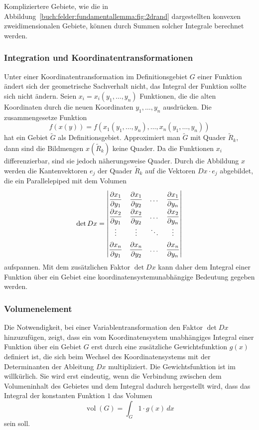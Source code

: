 Kompliziertere Gebiete, wie die in
Abbildung~\ref{buch:felder:fundamentallemma:fig:2drand}
dargestellten konvexen zweidimensionalen Gebiete, können durch Summen solcher
Integrale berechnet werden.

%
%
\subsubsection{Integration und Koordinatentransformationen}
Unter einer Koordinatentransformation im Definitionsgebiet 
$G$ einer Funktion ändert sich der geometrische Sachverhalt nicht,
das Integral der Funktion sollte sich nicht ändern.
Seien $x_i=x_i(y_1,\dots,y_n)$ Funktionen, die die alten Koordinaten
durch die neuen Koordinaten $y_1,\dots,y_n$ ausdrücken.
Die zusammengesetze Funktion
\[
f(x(y))
=
f(x_1(y_1,\dots,y_n),\dots,x_n(y_1,\dots,y_n))
\]
hat ein Gebiet $\tilde{G}$ als Definitionsgebiet.
Approximiert man $\tilde{G}$ mit Quader $\tilde{R}_k$, dann sind
die Bildmengen $x(\tilde{R}_k)$ keine Quader.
Da die Funktionen $x_i$ differenzierbar, sind sie jedoch näherungsweise
Quader.
Durch die Abbildung $x$ werden die Kantenvektoren $e_j$ der Quader 
$\tilde{R}_k$ auf die Vektoren $Dx\cdot e_j$ abgebildet, die ein
Parallelepiped mit dem Volumen
\[
\det Dx
=
\left|
\renewcommand{\arraystretch}{1.9}
\begin{matrix}
\displaystyle
\frac{\partial x_1}{\partial y_1}
&
\displaystyle
\frac{\partial x_1}{\partial y_2}
&\dots&
\displaystyle
\frac{\partial x_1}{\partial y_n}
\\
\displaystyle
\frac{\partial x_2}{\partial y_1}
&
\displaystyle
\frac{\partial x_2}{\partial y_2}
&\dots&
\displaystyle
\frac{\partial x_2}{\partial y_n}
\\
\vdots&\vdots&\ddots&\vdots\\
\displaystyle
\frac{\partial x_n}{\partial y_1}
&
\displaystyle
\frac{\partial x_n}{\partial y_2}
&\dots&
\displaystyle
\frac{\partial x_n}{\partial y_n}
\end{matrix}
\right|
\]
aufspannen.
Mit dem zusätzlichen Faktor $\det Dx$ kann daher dem Integral einer Funktion
über ein Gebiet eine koordinatensystemunabhängige Bedeutung gegeben werden.

%
%
\subsubsection{Volumenelement}
Die Notwendigkeit, bei einer Variablentransformation den Faktor
$\det Dx$ hinzuzufügen, zeigt, dass ein vom Koordinatensystem unabhängiges
Integral einer Funktion über ein Gebiet $G$ erst durch eine zusätzliche
Gewichtsfunktion $g(x)$ definiert ist, die sich beim Wechsel des
Koordinatensystems mit der Determinanten der Ableitung $Dx$ multipliziert.
Die Gewichtsfunktion ist im willkürlich.
Sie wird erst eindeutig,
wenn die Verbindung zwischen dem Volumeninhalt des Gebietes und 
dem Integral dadurch hergestellt wird, dass das Integral der konstanten
Funktion $1$ das Volumen
\[
\operatorname{vol}(G)
=
\int_G 1\cdot g(x)\,dx
\]
sein soll.

